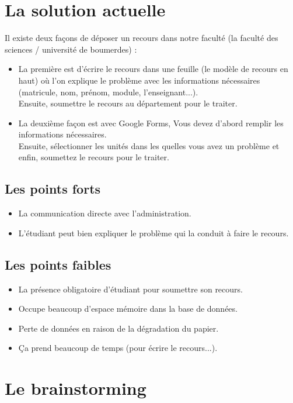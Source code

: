 \documentclass[12pt]{report}
\begin{document}
\newpage

\section{La solution actuelle}
Il existe deux façons de déposer un recours dans notre faculté (la faculté des sciences / université de boumerdes) :
\begin{itemize}
    \item La première est d'écrire le recours dans une feuille (le modèle de recours en haut) où l'on explique le problème avec les informations nécessaires (matricule, nom, prénom, module, l'enseignant...).\\Ensuite, soumettre le recours au département pour le traiter.
    \item La deuxième façon est avec Google Forms, Vous devez d'abord remplir les informations nécessaires.\\Ensuite, sélectionner les unités dans les quelles vous avez un problème et enfin, soumettez le recours pour le traiter.
\end{itemize}

\subsection{Les points forts}
\begin{itemize}
    \item La communication directe avec l'administration.
    \item L'étudiant peut bien expliquer le problème qui la conduit à faire le recours. 
\end{itemize}

\subsection{Les points faibles}
\begin{itemize}
    \item La présence obligatoire d'étudiant pour soumettre son recours.
    \item Occupe beaucoup d'espace mémoire dans la base de données.
    \item Perte de données en raison de la dégradation du papier.
    \item Ça prend beaucoup de temps (pour écrire le recours...).
\end{itemize}

\section{Le brainstorming}
\end{document}
